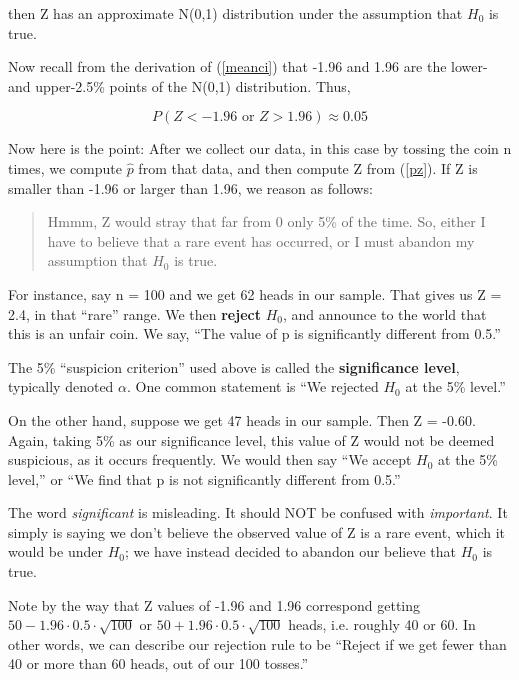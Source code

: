 then Z has an approximate N(0,1) distribution under the assumption that
$H_0$ is true.

Now recall from the derivation of (\ref{meanci}) that -1.96 and 1.96 are
the lower- and upper-2.5\% points of the N(0,1) distribution.  Thus,

\begin{equation}
P(Z < -1.96 \textrm{ or } Z > 1.96) \approx 0.05
\end{equation}

Now here is the point:  After we collect our data, in this case by
tossing the coin n times, we compute $\widehat{p}$ from that data,
and then compute Z from (\ref{pz}).  If Z is smaller than -1.96 or
larger than 1.96, we reason as follows:

\begin{quote}
Hmmm, Z would stray that far from 0 only 5\% of the time.  So, either I
have to believe that a rare event has occurred, or I must abandon my
assumption that $H_0$ is true.
\end{quote}

For instance, say n = 100 and we get 62 heads in our sample.  That gives
us Z = 2.4, in that ``rare'' range.  We then {\bf reject} $H_0$, and
announce to the world that this is an unfair coin.  We say, ``The value
of p is significantly different from 0.5.'' 

The 5\% ``suspicion criterion'' used above is called the {\bf
significance level}, typically denoted $\alpha$.  One common statement
is ``We rejected $H_0$ at the 5\% level.''

On the other hand, suppose we get 47 heads in our sample.  Then Z =
-0.60.  Again, taking 5\% as our significance level, this value of Z
would not be deemed suspicious, as it occurs frequently.  We would then
say ``We accept $H_0$ at the 5\% level,'' or ``We find that p is not
significantly different from 0.5.''

The word {\it significant} is misleading.  It should NOT be confused
with {\it important}.  It simply is saying we don't believe the observed
value of Z is a rare event, which it would be under $H_0$; we have
instead decided to abandon our believe that $H_0$ is true.

Note by the way that Z values of -1.96 and 1.96 correspond getting $50 -
1.96 \cdot 0.5 \cdot \sqrt{100}$ or $50 + 1.96 \cdot 0.5 \cdot
\sqrt{100}$ heads, i.e. roughly 40 or 60.  In other words, we can
describe our rejection rule to be ``Reject if we get fewer than 40 or
more than 60 heads, out of our 100 tosses.''

